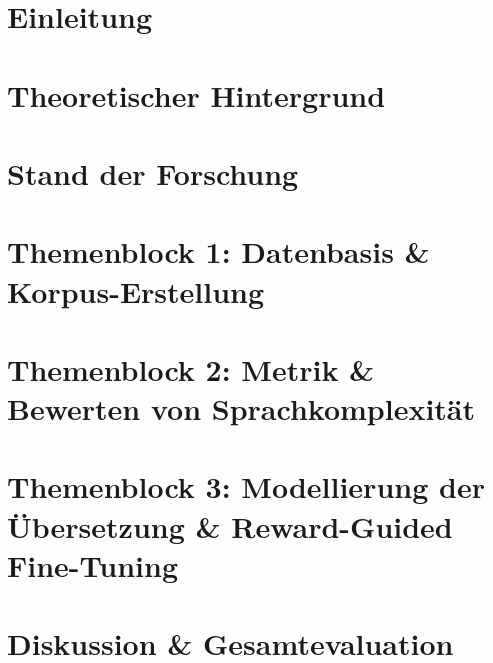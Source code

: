 \documentclass{article}
\begin{document}

\newpage


\newpage


\newpage


\newpage


\newpage
\tableofcontents
\thispagestyle{empty}

\newpage
{} %
\section{Einleitung}\label{sec:einleitung}


\newpage
\section{Theoretischer Hintergrund}


\newpage
\section{Stand der Forschung}


\newpage
\section{Themenblock 1: Datenbasis \& Korpus-Erstellung}\label{sec:themenblock1_datenbasis}


\newpage
\section{Themenblock 2: Metrik \& Bewerten von Sprachkomplexität}\label{sec:themenblock2_metrik}


\newpage
\section{Themenblock 3: Modellierung der Übersetzung \& Reward-Guided Fine-Tuning}\label{sec:themenblock3_translation}


\newpage
\section{Diskussion \& Gesamtevaluation}\label{sec:diskussion}

\end{document}
